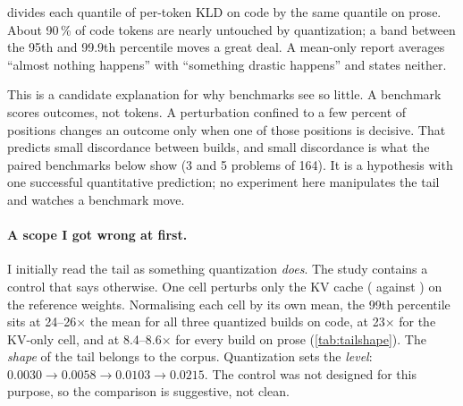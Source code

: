  divides each quantile of per-token KLD on code by the same quantile on prose. About
90\,\% of code tokens are nearly untouched by quantization; a band between the 95th and 99.9th
percentile moves a great deal. A mean-only report averages ``almost nothing happens'' with ``something
drastic happens'' and states neither.

This is a candidate explanation for why benchmarks see so little. A benchmark scores outcomes, not
tokens. A perturbation confined to a few percent of positions changes an outcome only when one of
those positions is decisive. That predicts small discordance between builds, and small discordance is
what the paired benchmarks below show (3 and 5 problems of 164). It is a hypothesis with one successful
quantitative prediction; no experiment here manipulates the tail and watches a benchmark move.

\paragraph{A scope I got wrong at first.} I initially read the tail as something quantization
\emph{does}. The study contains a control that says otherwise. One cell perturbs only the KV cache
( against ) on the reference weights. Normalising each cell by its own
mean, the 99th percentile sits at 24--26$\times$ the mean for all three quantized builds on code, at
23$\times$ for the KV-only cell, and at 8.4--8.6$\times$ for every build on prose
(\cref{tab:tailshape}). The \emph{shape} of the tail belongs to the corpus. Quantization sets the
\emph{level}: $0.0030 \rightarrow 0.0058 \rightarrow 0.0103 \rightarrow 0.0215$. The control was not
designed for this purpose, so the comparison is suggestive, not clean.

\begin{table}[t]
\centering\small
\caption{Tail shape, each cell normalised by its own mean KLD. Flat within a corpus over a $7\times$
range of mean divergence; different by about $3\times$ between corpora; reproduced by a perturbation
with no weight quantization in it.}\label{tab:tailshape}
\end{table}


